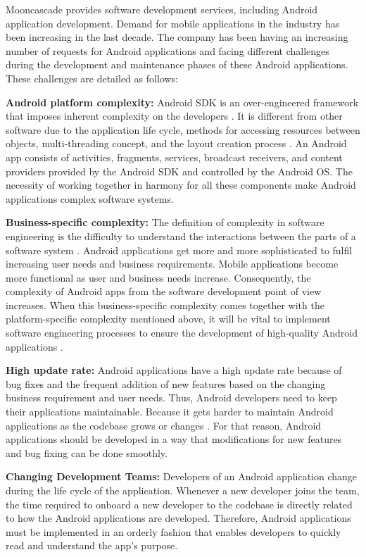 Mooncascade provides software development services, including Android application development. Demand for mobile applications in the industry has been increasing in the last decade. The company has been having an increasing number of requests for Android applications and facing different challenges during the development and maintenance phases of these Android applications. These challenges are detailed as follows:

\noindent\textbf{Android platform complexity:} Android SDK is an over-engineered framework that imposes inherent complexity on the developers  \cite{56}. It is different from other software due to the application life cycle, methods for accessing resources between objects, multi-threading concept, and the layout creation process \cite{52}. An Android app consists of activities, fragments, services, broadcast receivers, and content providers provided by the Android SDK and controlled by the Android OS. The necessity of working together in harmony for all these components make Android applications complex software systems.

\noindent\textbf{Business-specific complexity:} The definition of complexity in software engineering is the difficulty to understand the interactions between the parts of a software system \cite{57}. Android applications get more and more sophisticated to fulfil increasing user needs and business requirements. Mobile applications become more functional as user and business needs increase. Consequently, the complexity of Android apps from the software development point of view increases. When this business-specific complexity comes together with the platform-specific complexity mentioned above, it will be vital to implement software engineering processes to ensure the development of high-quality Android applications \cite{2}. 

\noindent\textbf{High update rate:} Android applications have a high update rate \cite{3} because of bug fixes and the frequent addition of new features based on the changing business requirement and user needs. Thus, Android developers need to keep their applications maintainable. Because it gets harder to maintain Android applications as the codebase grows or changes \cite{34}. For that reason, Android applications should be developed in a way that modifications for new features and bug fixing can be done smoothly.

\noindent\textbf{Changing Development Teams:}  Developers of an Android application change during the life cycle of the application. Whenever a new developer joins the team, the time required to onboard a new developer to the codebase is directly related to how the Android applications are developed. Therefore, Android applications must be implemented in an orderly fashion that enables developers to quickly read and understand the app's purpose.

